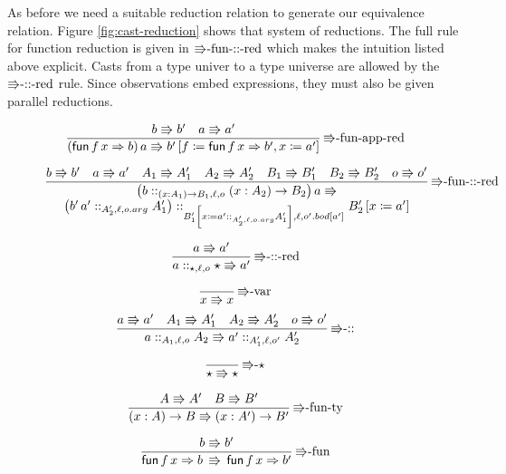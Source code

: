 As before we need a suitable reduction relation to generate our equivalence
relation. Figure \ref{fig:cast-reduction} shows that system of reductions.
The full rule for function reduction is given in $\textrm{\ensuremath{\Rrightarrow}-fun-::-red}$
which makes the intuition listed above explicit. Casts from a type
univer to a type universe are allowed by the $\textrm{\ensuremath{\Rrightarrow}-::-red}$
rule. Since observations embed expressions, they must also be given
parallel reductions.

\begin{figure}
\[
\frac{b\Rrightarrow b'\quad a\Rrightarrow a'}{\left(\mathsf{fun}\,f\,x\Rightarrow b\right)a\Rrightarrow b'\left[f\coloneqq\mathsf{fun}\,f\,x\Rightarrow b',x\coloneqq a'\right]}\,\textrm{\ensuremath{\Rrightarrow}-fun-app-red}
\]

\[
\frac{b\Rrightarrow b'\quad a\Rrightarrow a'\quad A_{1}\Rrightarrow A_{1}'\quad A_{2}\Rrightarrow A_{2}'\quad B_{1}\Rrightarrow B_{1}'\quad B_{2}\Rrightarrow B_{2}'\quad o\Rrightarrow o'}{\begin{array}{c}
\left(b::_{\left(x:A_{1}\right)\rightarrow B_{1},\ensuremath{\ell},o}\left(x:A_{2}\right)\rightarrow B_{2}\right)a\Rrightarrow\\
\left(b'\,a'::_{A_{2}',\ell,o.arg}A_{1}'\right)::_{B_{1}'\left[x\coloneqq a'::_{A_{2}',\ell,o.arg}A_{1}'\right],\ensuremath{\ell},o'.bod[a']}B_{2}'\left[x\coloneqq a'\right]
\end{array}}\,\textrm{\ensuremath{\Rrightarrow}-fun-::-red}
\]

\[
\frac{a\Rrightarrow a'}{a::_{\star,\ensuremath{\ell},o}\star\Rrightarrow a'}\,\textrm{\ensuremath{\Rrightarrow}-::-red}
\]

\[
\frac{\,}{x\Rrightarrow x}\,\textrm{\ensuremath{\Rrightarrow}-var}
\]
\[
\frac{a\Rrightarrow a'\quad A_{1}\Rrightarrow A_{1}'\quad A_{2}\Rrightarrow A_{2}'\quad o\Rrightarrow o'}{a::_{A_{1},\ensuremath{\ell},o}A_{2}\Rrightarrow a'::_{A_{1}',\ensuremath{\ell},o'}A_{2}'}\,\textrm{\ensuremath{\Rrightarrow}-::}
\]

\[
\frac{\,}{\star\Rrightarrow\star}\,\textrm{\ensuremath{\Rrightarrow}-}\star
\]

\[
\frac{A\Rrightarrow A'\quad B\Rrightarrow B'}{\left(x:A\right)\rightarrow B\Rrightarrow\left(x:A'\right)\rightarrow B'}\,\textrm{\ensuremath{\Rrightarrow}-fun-ty}
\]

\[
\frac{b\Rrightarrow b'}{\mathsf{fun}\,f\,x\Rightarrow b\,\Rrightarrow\,\mathsf{fun}\,f\,x\Rightarrow b'}\,\textrm{\ensuremath{\Rrightarrow}-fun}
\]


\end{figure}
